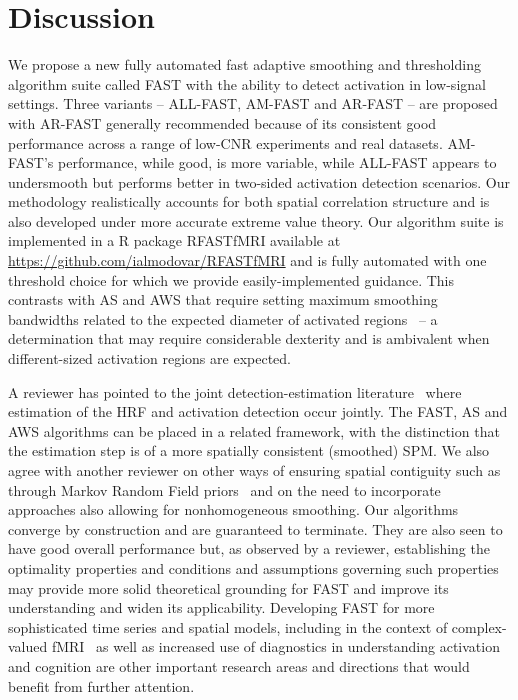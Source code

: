 \section{Discussion}\label{discussion}
We propose a new  fully automated fast adaptive 
smoothing and thresholding algorithm suite called FAST with the
ability to detect activation in  low-signal settings. Three
variants -- ALL-FAST, AM-FAST and AR-FAST -- are proposed with AR-FAST
generally recommended because of its consistent good performance
across a range of low-CNR experiments and real datasets.
 AM-FAST's performance, while good, is more
variable, while   ALL-FAST appears to undersmooth but performs better
in two-sided activation detection scenarios. Our methodology realistically
accounts for both spatial correlation structure and is also developed
under more accurate extreme value theory. Our algorithm suite is
implemented in a R package {\sc RFASTfMRI} available at
\href{https://github.com/ialmodovar/RFASTfMRI}{https://github.com/ialmodovar/RFASTfMRI} and is fully automated with one threshold choice for which we provide 
easily-implemented guidance. This contrasts with AS and AWS that
require setting  maximum smoothing bandwidths related to the expected
diameter of activated regions~\cite{polzehletal10} -- a determination
that may require considerable dexterity and is ambivalent when different-sized
activation regions are expected.

A reviewer has pointed to the joint detection-estimation
literature~\citep{maknietal05,maknietal06} where estimation of the HRF
and activation detection occur jointly. The FAST, AS and AWS algorithms
can be placed  in a related framework, with the distinction that the
estimation step is of a more spatially consistent (smoothed)
SPM. We also agree with another reviewer on other ways of ensuring
spatial contiguity such as through Markov Random Field
priors~\citep{ngetal12} and on the need to incorporate
approaches also allowing for nonhomogeneous smoothing.
Our algorithms converge by construction and are guaranteed to
terminate. They are also seen to have good overall performance  but,
as observed by a  reviewer, establishing the 
optimality   properties  and conditions and
assumptions governing such properties may 
provide more solid theoretical grounding for FAST and improve its
understanding and widen its applicability. %
Developing FAST for more  sophisticated time series  and spatial
models, including in the 
context of complex-valued 
fMRI~\citep{adrianetal18} as well as increased use of diagnostics in
understanding activation and cognition are other important research areas
and directions that would benefit from further attention.



